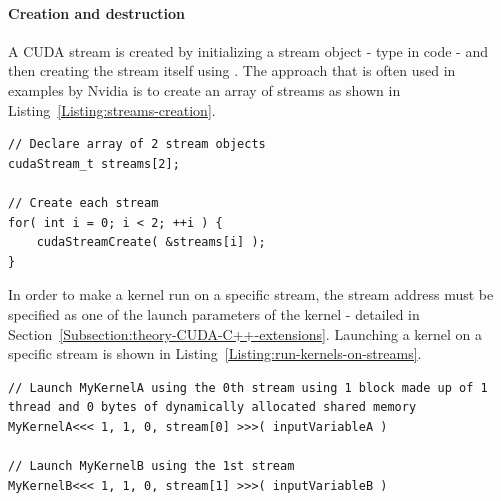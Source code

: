 \paragraph{Creation and destruction}
A CUDA stream is created by initializing a stream object - type  in code - and then creating the stream itself using . The approach that is often used in examples by Nvidia is to create an array of streams as shown in Listing~\ref{Listing:streams-creation}.

\begin{lstlisting}[caption={Creation of streams. Taken from Nvidia's \emph{CUDA C++ Programming Guide} \cite{NVIDIAMay2022}.},label={Listing:streams-creation}]
// Declare array of 2 stream objects
cudaStream_t streams[2];

// Create each stream
for( int i = 0; i < 2; ++i ) {
	cudaStreamCreate( &streams[i] );
}
\end{lstlisting}

In order to make a kernel run on a specific stream, the stream address must be specified as one of the launch parameters of the kernel - detailed in Section~\ref{Subsection:theory-CUDA-C++-extensions}. Launching a kernel on a specific stream is shown in Listing~\ref{Listing:run-kernels-on-streams}.

\begin{lstlisting}[caption={Pseudo-code for launching two different kernels using two different streams. The instructions in this example would be executed from the host. Since each kernel is essentially an open door to the device for instructions, then, once \code{MyKernelA} is launched on \code{stream[0]}, the control is returned to the host without waiting for \code{MyKernelA} to finish. Subsequently, the host will immediately launch \code{MyKernelB} using \code{stream[1]}. In this example, each kernel is launched on a grid made up of one single-thread block with 0 bytes of dynamic shared memory allocated, thus, the devic resources will not be exhausted and both kernels will run concurrently. Taken from Nvidia's \emph{CUDA C++ Programming Guide} \cite{NVIDIAMay2022}.},label={Listing:run-kernels-on-streams}]
// Launch MyKernelA using the 0th stream using 1 block made up of 1 thread and 0 bytes of dynamically allocated shared memory
MyKernelA<<< 1, 1, 0, stream[0] >>>( inputVariableA )

// Launch MyKernelB using the 1st stream
MyKernelB<<< 1, 1, 0, stream[1] >>>( inputVariableB )
\end{lstlisting}

